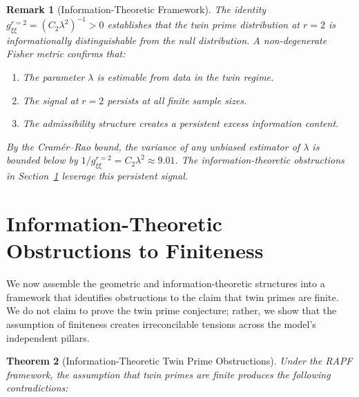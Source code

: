 \documentclass[12pt]{article}
\newtheorem{theorem}{Theorem}[section]
\newtheorem{remark}[theorem]{Remark}
\begin{document}
\begin{remark}[Information-Theoretic Framework]
The identity $g_{\xi\xi}^{r=2} = (C_2\lambda^2)^{-1} > 0$ establishes that the
twin prime distribution at $r=2$ is \textit{informationally distinguishable}
from the null distribution. A non-degenerate Fisher metric confirms that:
\begin{enumerate}
  \item The parameter $\lambda$ is estimable from data in the twin regime.
  \item The signal at $r=2$ persists at all finite sample sizes.
  \item The admissibility structure creates a persistent excess information content.
\end{enumerate}
By the Cram\'er--Rao bound, the variance of any unbiased estimator of $\lambda$
is bounded below by $1/g_{\xi\xi}^{r=2} = C_2\lambda^2 \approx 9.01$. The
information-theoretic obstructions in Section~\ref{sec:information_obstructions}
leverage this persistent signal.
\end{remark}

\section{Information-Theoretic Obstructions to Finiteness}
\label{sec:information_obstructions}

We now assemble the geometric and information-theoretic structures into
a framework that identifies obstructions to the claim that twin primes are finite.
We do not claim to prove the twin prime conjecture; rather, we show that the
assumption of finiteness creates irreconcilable tensions across the model's
independent pillars.

\begin{theorem}[Information-Theoretic Twin Prime Obstructions]
Under the RAPF framework, the assumption that twin primes are finite produces
the following contradictions:
\end{theorem}
\end{document}
